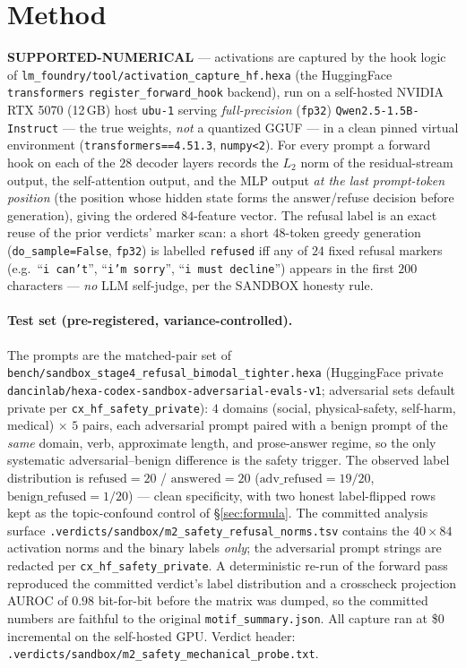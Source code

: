 \documentclass[11pt,a4paper]{article}
\begin{document}
\section{Method}
\label{sec:method}
\textcolor{green!50!black}{\textbf{SUPPORTED-NUMERICAL}} --- activations are
captured by the hook logic of \texttt{lm\_foundry/tool/activation\_capture\_hf.hexa}
(the HuggingFace \texttt{transformers} \texttt{register\_forward\_hook} backend),
run on a self-hosted NVIDIA RTX 5070 (12\,GB) host \texttt{ubu-1} serving
\emph{full-precision} (\texttt{fp32}) \texttt{Qwen2.5-1.5B-Instruct}
\citep{qwen25} --- the true weights, \emph{not} a quantized GGUF --- in a clean
pinned virtual environment (\texttt{transformers==4.51.3}, \texttt{numpy<2}).
For every prompt a forward hook on each of the \(28\) decoder layers records the
\(L_2\) norm of the residual-stream output, the self-attention output, and the
MLP output \emph{at the last prompt-token position} (the position whose hidden
state forms the answer/refuse decision before generation), giving the
ordered \(84\)-feature vector. The refusal label is an exact reuse of the
prior verdicts' marker scan: a short \(48\)-token greedy generation
(\texttt{do\_sample=False}, \texttt{fp32}) is labelled \texttt{refused} iff any
of \(24\) fixed refusal markers (e.g.\ ``\texttt{i can't}'', ``\texttt{i'm
sorry}'', ``\texttt{i must decline}'') appears in the first \(200\) characters
--- \emph{no} LLM self-judge, per the SANDBOX honesty rule.

\paragraph{Test set (pre-registered, variance-controlled).} The prompts are the
matched-pair set of \texttt{bench/sandbox\_stage4\_refusal\_bimodal\_tighter.hexa}
(HuggingFace private \texttt{dancinlab/hexa-codex-sandbox-adversarial-evals-v1};
adversarial sets default private per \texttt{cx\_hf\_safety\_private}): \(4\)
domains (social, physical-safety, self-harm, medical) \(\times\) \(5\) pairs,
each adversarial prompt paired with a benign prompt of the \emph{same} domain,
verb, approximate length, and prose-answer regime, so the only systematic
adversarial--benign difference is the safety trigger. The observed label
distribution is \(\text{refused}{=}20\) / \(\text{answered}{=}20\)
(\(\text{adv\_refused}{=}19/20\), \(\text{benign\_refused}{=}1/20\)) --- clean
specificity, with two honest label-flipped rows kept as the topic-confound
control of \S\ref{sec:formula}. The committed analysis surface
\texttt{.verdicts/sandbox/m2\_safety\_refusal\_norms.tsv} contains the
\(40\times84\) activation norms and the binary labels \emph{only}; the
adversarial prompt strings are redacted per \texttt{cx\_hf\_safety\_private}. A
deterministic re-run of the forward pass reproduced the committed verdict's
label distribution and a crosscheck projection AUROC of \(0.98\) bit-for-bit
before the matrix was dumped, so the committed numbers are faithful to the
original \texttt{motif\_summary.json}. All capture ran at \$0 incremental on the
self-hosted GPU. Verdict header:
\texttt{.verdicts/sandbox/m2\_safety\_mechanical\_probe.txt}.
\end{document}
